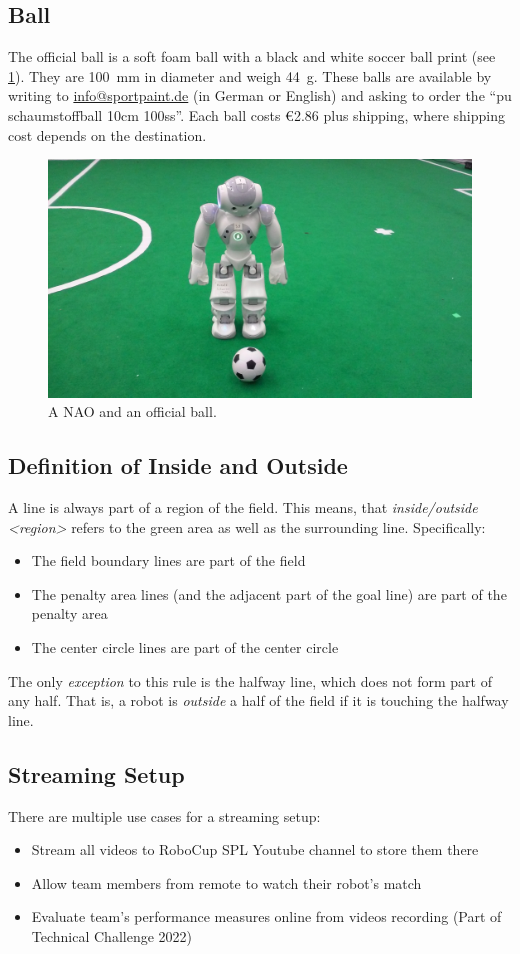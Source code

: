 \subsection{Ball}
\label{sec:ball}

The official ball is a soft foam ball with a black and white soccer ball print (see \cref{fig:ball}). They are \qty{100}{\milli\metre} in diameter and weigh \qty{44}{\gram}. These balls are available by writing to \url{info@sportpaint.de} (in German or English) and asking to order the ``pu schaumstoffball 10cm 100ss''.  Each ball costs \euro{2.86} plus shipping, where shipping cost depends on the destination.

\begin{figure}[t]
  \centerline{\includegraphics[height=0.28\columnwidth]{figs/robotWithBall2016.jpg}}
  \caption{A NAO and an official ball.}
  \label{fig:ball}
\end{figure}

\subsection{Definition of Inside and Outside}
\label{sec:inside_outside}

A line is always part of a region of the field.
This means, that \emph{inside/outside \textless region\textgreater} refers to the green area as well as the surrounding line.
Specifically:
\begin{itemize}
    \item The field boundary lines are part of the field
    \item The penalty area lines (and the adjacent part of the goal line) are part of the penalty area
    \item The center circle lines are part of the center circle
\end{itemize}

The only \textit{exception} to this rule is the halfway line, which does not form part of any half.
That is, a robot is \textit{outside} a half of the field if it is touching the halfway line.

\subsection{Streaming Setup}
\label{sec:streaming_setup}

There are multiple use cases for a streaming setup:
\begin{itemize}
    \item Stream all videos to RoboCup SPL Youtube channel to store them there
    \item Allow team members from remote to watch their robot's match
    \item Evaluate team's performance measures online from videos recording (Part of Technical Challenge 2022)
\end{itemize}
